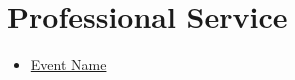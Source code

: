 \section{Professional Service}
\begin{itemize}
      \item {}
            {\underline{Event Name}}{}
\end{itemize}
